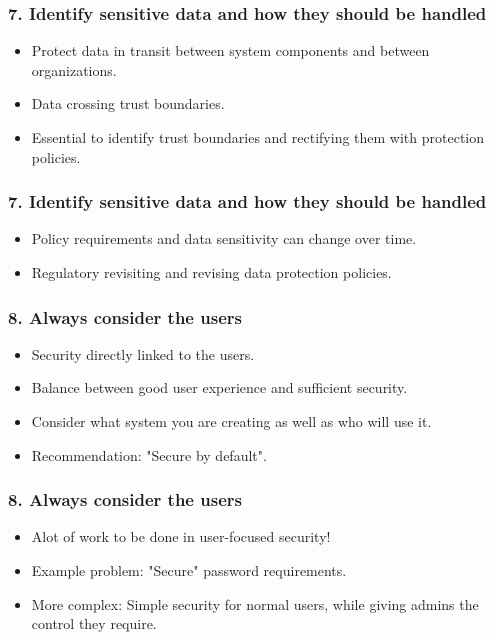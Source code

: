 \documentclass[12pt,norsk]{beamer}
\begin{document}
\begin{frame}

	\frametitle{7. Identify sensitive data and how they should be handled}
	\begin{itemize}

		\item Protect data in transit between system components and between organizations.
		\item Data crossing trust boundaries.
		\item Essential to identify trust boundaries and rectifying them with protection policies.
		
		
		
	\end{itemize}
	

\end{frame}


\begin{frame}

	\frametitle{7. Identify sensitive data and how they should be handled}
	\begin{itemize}

		\item Policy requirements and data sensitivity can change over time.
		\item Regulatory revisiting and revising data protection policies.		
		
	\end{itemize}
	

\end{frame}

\begin{frame}

	\frametitle{8. Always consider the users}
	
	\begin{itemize}
	
		\item Security directly linked to the users.
		\item Balance between good user experience and sufficient security.
		\item Consider what system you are creating as well as who will use it.
		\item Recommendation: "Secure by default".
	\end{itemize}

\end{frame}

\begin{frame}
 
	\frametitle{8. Always consider the users}
	
	\begin{itemize}
	
	\item Alot of work to be done in user-focused security!
	\item Example problem: "Secure" password requirements.
	\item More complex: Simple security for normal users, while giving admins the control they require.
	
	\end{itemize}

\end{frame}
\end{document}
